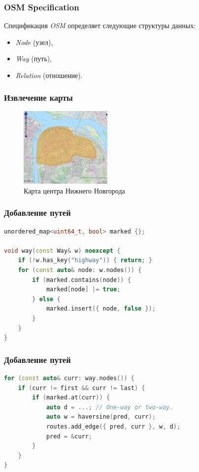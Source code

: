 \documentclass{beamer}
\begin{document}
\begin{frame}
\frametitle{OSM Specification}
Спецификация \textit{OSM} определяет следующие структуры данных:
\begin{itemize}
\item \textit{Node} (узел),
\item \textit{Way} (путь),
\item \textit{Relation} (отношение).
\end{itemize}
\end{frame}

\begin{frame}
\frametitle{Извлечение карты}
\begin{figure}[ht]
	\centering	
	\includegraphics[width=0.4\textwidth]{images/bbbike.png}
	\caption{Карта центра Нижнего Новгорода}
	\label{fig:bbbike}
	\end{figure}
\end{frame}

\begin{frame}[fragile]
\frametitle{Добавление путей}
\begin{lstlisting}[language=C++]
 unordered_map<uint64_t, bool> marked {};
 
void way(const Way& w) noexcept {
	if (!w.has_key("highway")) { return; }
	for (const auto& node: w.nodes()) {
		if (marked.contains(node)) {
			marked[node] |= true;
		} else {
			marked.insert({ node, false });
		}
	}
}
\end{lstlisting}
\end{frame}

\begin{frame}[fragile]
\frametitle{Добавление путей}
\begin{lstlisting}[language=C++]
for (const auto& curr: way.nodes()) {
	if (curr != first && curr != last) {
     	if (marked.at(curr)) {
     		auto d = ...; // One-way or two-way.
			auto w = haversine(pred, curr);
			routes.add_edge({ pred, curr }, w, d);
			pred = &curr;
		}
	}
}
\end{lstlisting}
\end{frame}
\end{document}
